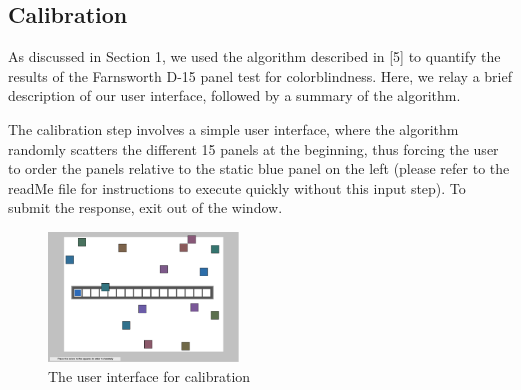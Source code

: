 \documentclass[10pt,twocolumn,letterpaper]{article}
\begin{document}
\subsection{Calibration}

As discussed in Section 1, we used the algorithm described in [5] to quantify the results of the Farnsworth D-15 panel test for colorblindness. Here, we relay a brief description of our user interface, followed by a summary of the algorithm.

The calibration step involves a simple user interface, where the algorithm randomly scatters the different 15 panels at the beginning, thus forcing the user to order the panels relative to the static blue panel on the left (please refer to the readMe file for instructions to execute quickly without this input step). To submit the response, exit out of the window.

\begin{figure}[h]
  \centering
  \includegraphics[width=0.45\textwidth]{panel.png}
  \caption{The user interface for calibration}
  \label{fig:panel}
\end{figure}
\end{document}
